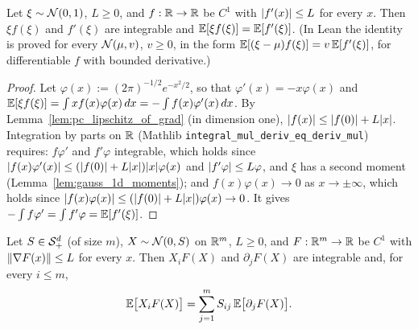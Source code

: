 \begin{lemma}\label{lem:psf_ibp_1d}
\leanok
{}
Let $\xi\sim\mathcal{N}(0,1)$, $L\ge0$, and $f : \mathbb{R}\to\mathbb{R}$ be $C^1$ with $\lvert f'(x) \rvert\le L$ for
every $x$. Then $\xi f(\xi)$ and $f'(\xi)$ are integrable and $\mathbb{E}[\xi f(\xi)] = \mathbb{E}[f'(\xi)]$.
(In Lean the identity is proved for every $\mathcal{N}(\mu, v)$, $v \ge 0$, in the form
$\mathbb{E}[(\xi-\mu)f(\xi)] = v\,\mathbb{E}[f'(\xi)]$, for differentiable $f$ with bounded derivative.)
\end{lemma}

\begin{proof}
\leanok
{}
Let $\varphi(x) := (2\pi)^{-1/2}e^{-x^2/2}$, so that $\varphi'(x) = -x\varphi(x)$ and
$\mathbb{E}[\xi f(\xi)] = \int x f(x)\varphi(x)\,dx = -\int f(x)\varphi'(x)\,dx$. By
Lemma~\ref{lem:pc_lipschitz_of_grad} (in dimension one), $\lvert f(x) \rvert\le\lvert f(0) \rvert+L\lvert x \rvert$.
Integration by parts on $\mathbb{R}$ (Mathlib \texttt{integral\_mul\_deriv\_eq\_deriv\_mul}) requires:
$f\varphi'$ and $f'\varphi$ integrable, which holds since
$\lvert f(x)\varphi'(x) \rvert\le(\lvert f(0) \rvert+L\lvert x \rvert)\lvert x \rvert\varphi(x)$ and $\lvert f'\varphi \rvert\le L\varphi$,
and $\xi$ has a second moment (Lemma~\ref{lem:gauss_1d_moments}); and
$f(x)\varphi(x)\to 0$ as $x\to\pm\infty$, which holds since
$\lvert f(x)\varphi(x) \rvert\le(\lvert f(0) \rvert+L\lvert x \rvert)\varphi(x)\to0$. It gives
$-\int f\varphi' = \int f'\varphi = \mathbb{E}[f'(\xi)]$.
\end{proof}

\begin{lemma}\label{lem:gauss_ibp}
\leanok
{}
Let $S \in \mathcal{S}_{+}^{d}$ (of size $m$), $X \sim \mathcal{N}(0,S)$ on $\mathbb{R}^m$, $L\ge0$, and
$F : \mathbb{R}^m\to\mathbb{R}$ be $C^1$ with $\lVert \nabla F(x) \rVert\le L$ for every $x$. Then $X_iF(X)$ and
$\partial_jF(X)$ are integrable and, for every $i \le m$,
\[
  \mathbb{E}\big[X_i F(X)\big] = \sum_{j=1}^m S_{ij}\,\mathbb{E}\big[\partial_j F(X)\big].
\]
\end{lemma}


